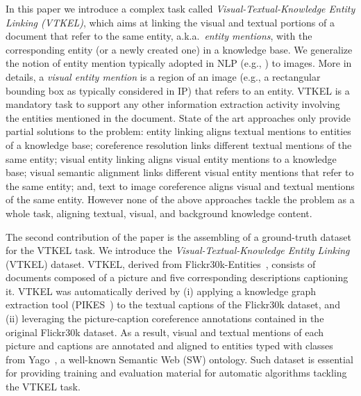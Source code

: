 \documentclass[11pt,a4paper]{article}
\begin{document}
In this paper we introduce a complex task called \emph{Visual-Textual-Knowledge Entity Linking (VTKEL)}, which aims at linking the visual and textual portions of a document that refer to the same entity, a.k.a.\ \emph{entity mentions}, with the corresponding entity (or a newly created one) in a knowledge base.  We generalize the notion of entity mention typically adopted in NLP (e.g., \cite{doddington2004automatic}) to images. More in details, a \emph{visual entity mention} is a region of an image  (e.g., a rectangular 
bounding box as typically considered in IP) that refers to an entity. VTKEL is a mandatory task to support any other information extraction activity involving the entities mentioned in the document.
%
State of the art approaches only provide partial solutions to the problem: entity linking \cite{shen2015entity} aligns textual mentions 
to entities of a knowledge base; coreference resolution \cite{sukthanker2018anaphora} links different textual mentions of the same entity; visual entity linking \cite{venkitasubramanian2017entity} aligns visual entity mentions to a knowledge base; visual semantic 
alignment \cite{karpathy2015deep} links different visual entity mentions that refer to the same entity; and, text to image coreference \cite{KongCVPR14} aligns visual and textual mentions of the same entity. However none of the above approaches tackle the problem as a whole task, aligning textual, visual, and background knowledge content.

The second contribution of the paper is the assembling of a ground-truth dataset for the VTKEL task. We introduce the \emph{Visual-Textual-Knowledge Entity Linking} (VTKEL) dataset. VTKEL, derived from Flickr30k-Entities~\cite{plummer2015flickr30k}, consists of documents 
composed of a picture and five corresponding descriptions captioning it.
VTKEL was automatically derived by (i) applying a knowledge graph extraction tool (PIKES~\cite{corcoglioniti2016frame}) to the textual captions of the Flickr30k dataset, and (ii) leveraging the picture-caption coreference annotations contained in the original Flickr30k dataset. As a result, visual and textual mentions of each picture and captions are annotated and aligned to entities typed with classes from  Yago~\cite{yago}, a well-known Semantic Web (SW) ontology. Such dataset is essential for providing training and evaluation material for automatic algorithms tackling the VTKEL task.
\end{document}
